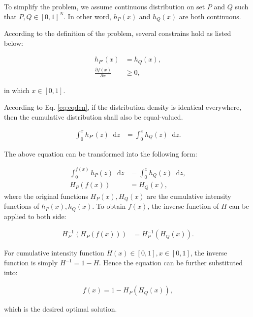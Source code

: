 \documentclass[12pt]{article}
\newcommand*\diff{\mathop{}\!\mathrm{d}}
\begin{document}
To simplify the problem, we assume continuous distribution on set $P$ and $Q$ such that $P,Q\in [0,1]^N$. In other word, $h_P(x)$ and $h_Q(x)$ are both continuous. 

According to the definition of the problem, several constrains hold as listed below:

\begin{align}
h_{P'}(x) &=h_{Q}(x),\label{eq:eqden} \\
\frac{\partial f(x)}{\partial x} & \ge 0,
\end{align}

in which $x \in [0,1] $.

According to Eq. \ref{eq:eqden}, if the distribution density is identical everywhere, then the cumulative distribution shall also be equal-valued.

\begin{align}
\int_0^x h_{P'}(z) \diff z &= \int_0^x h_{Q}(z) \diff z.
\end{align}

The above equation can be transformed into the following form:

\begin{align}
\int_0^{f(x)} h_{P}(z) \diff z &= \int_0^x h_{Q}(z) \diff z, \\
H_P(f(x)) &= H_Q(x),
\end{align}
where the original functions $H_P(x),H_Q(x)$ are the cumulative intensity functions of $h_P(x),h_Q(x)$. To obtain $f(x)$, the inverse function of $H$ can be applied to both side:

\begin{align}
H^{-1}_P \left( H_P(f(x)) \right)  &= H^{-1}_P \left( H_Q(x) \right).
\end{align}

For cumulative intensity function $H(x) \in [0,1], x\in [0,1] $, the inverse function is simply $H^{-1} = 1-H$. Hence the equation can be further substituted into:

\begin{align}
f(x) = 1 - H_P(H_Q(x)),
\end{align}

which is the desired optimal solution.
\end{document}
